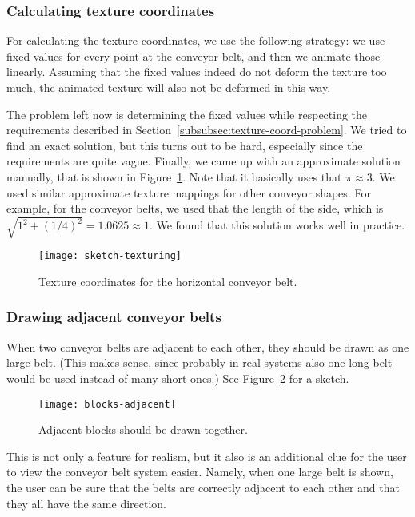 \subsubsection{Calculating texture coordinates}
\label{subsubsec:texture-coord-calculate}
For calculating the texture coordinates, we use the following strategy: we use fixed values for every point at the conveyor belt, and then we animate those linearly. Assuming that the fixed values indeed do not deform the texture too much, the animated texture will also not be deformed in this way.

The problem left now is determining the fixed values while respecting the requirements described in Section~\ref{subsubsec:texture-coord-problem}. We tried to find an exact solution, but this turns out to be hard, especially since the requirements are quite vague. Finally, we came up with an approximate solution manually, that is shown in Figure~\ref{fig:sketch-texturing}. Note that it basically uses that $\pi \approx 3$. We used similar approximate texture mappings for other conveyor shapes. For example, for the  conveyor belts, we used that the length of the side, which is $\sqrt{1^2 + (1/4)^2} = 1.0625 \approx 1$. We found that this solution works well in practice.
\begin{figure}
  \begin{center}
    \texttt{[image: sketch-texturing]}
    \caption{Texture coordinates for the horizontal conveyor belt.}
    \label{fig:sketch-texturing}
  \end{center}
\end{figure}

\subsubsection{Drawing adjacent conveyor belts}
\label{subsubsec:drawing-adjacent}
When two conveyor belts are adjacent to each other, they should be drawn as one large belt. (This makes sense, since probably in real systems also one long belt would be used instead of many short ones.) See Figure~\ref{fig:blocks-adjacent} for a sketch.
\begin{figure}
  \begin{center}
    \texttt{[image: blocks-adjacent]}
    \caption{Adjacent blocks should be drawn together.}
    \label{fig:blocks-adjacent}
  \end{center}
\end{figure}

This is not only a feature for realism, but it also is an additional clue for the user to view the conveyor belt system easier. Namely, when one large belt is shown, the user can be sure that the belts are correctly adjacent to each other and that they all have the same direction.
